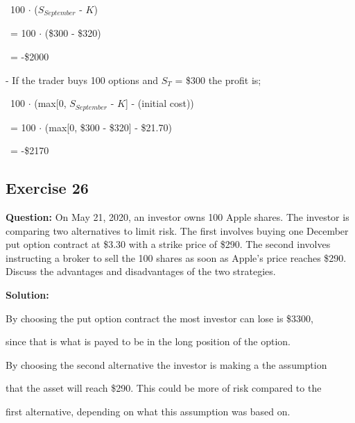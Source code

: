 \documentclass{article}
\begin{document}
\vspace{\baselineskip}

\, 100 $\cdot$ ($S_{September}$ - $K$) 

\vspace{\baselineskip}

\, = 100 $\cdot$ (\$300 - \$320)

\vspace{\baselineskip}

\, = -\$2000

\vspace{\baselineskip}

- If the trader buys 100 options and $S_T$ = \$300 the profit is;

\vspace{\baselineskip}

\, 100 $\cdot$ (max[0, $S_{September}$ - $K$]  - (initial cost))

\vspace{\baselineskip}

\, = 100  $\cdot$ (max[0, \$300 - \$320]  - \$21.70)

\vspace{\baselineskip}

\, = -\$2170

\subsection*{Exercise 26}

\textbf{Question:} On May 21, 2020, an investor owns 100 Apple shares. The
investor is comparing two alternatives to limit risk. The first involves buying one December put option contract
 at \$3.30 with a strike price of \$290. The second involves instructing a broker to sell the 100 shares as soon as Apple’s
price reaches \$290. Discuss the advantages and disadvantages of the two strategies.

\textbf{Solution:} 

By choosing the put option contract the most investor can lose is \$3300, 

since that is what is payed 
to be in the long position of the option.

\vspace{\baselineskip}

By choosing the second alternative the investor is making a the 
assumption 

that the asset will reach \$290. This could be more of risk compared to the 

first alternative, depending on what this assumption was based on.
\end{document}

